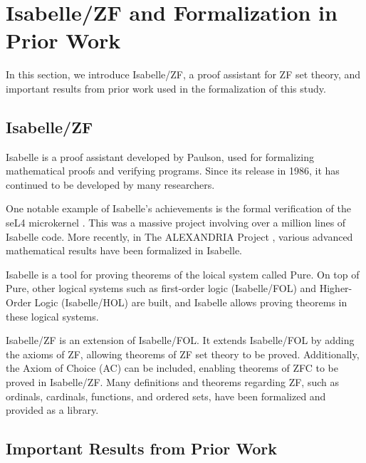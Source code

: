 \documentclass{report}
\begin{document}
\section{Isabelle/ZF and Formalization in Prior Work}
In this section, we introduce Isabelle/ZF, a proof assistant for ZF set theory, 
and important results from prior work used in the formalization of this study.


\subsection{Isabelle/ZF}
Isabelle \cite{paulson_1986} is a proof assistant developed by Paulson, used for formalizing mathematical proofs and verifying programs. 
Since its release in 1986, it has continued to be developed by many researchers.

One notable example of Isabelle's achievements is the formal verification of the seL4 microkernel \cite{seL4}.
This was a massive project involving over a million lines of Isabelle code. 
More recently, in The ALEXANDRIA Project \cite{alexiandria}, various advanced mathematical results have been formalized in Isabelle.

Isabelle is a tool for proving theorems of the loical system called Pure. 
On top of Pure, other logical systems such as first-order logic (Isabelle/FOL) and Higher-Order Logic (Isabelle/HOL) are built,
and Isabelle allows proving theorems in these logical systems.

Isabelle/ZF is an extension of Isabelle/FOL.
It extends Isabelle/FOL by adding the axioms of ZF, allowing theorems of ZF set theory to be proved.
Additionally, the Axiom of Choice (AC) can be included, enabling theorems of ZFC to be proved in Isabelle/ZF.
Many definitions and theorems regarding ZF, such as ordinals, cardinals, functions, and ordered sets, 
have been formalized and provided as a library.


\subsection{Important Results from Prior Work}
\end{document}
